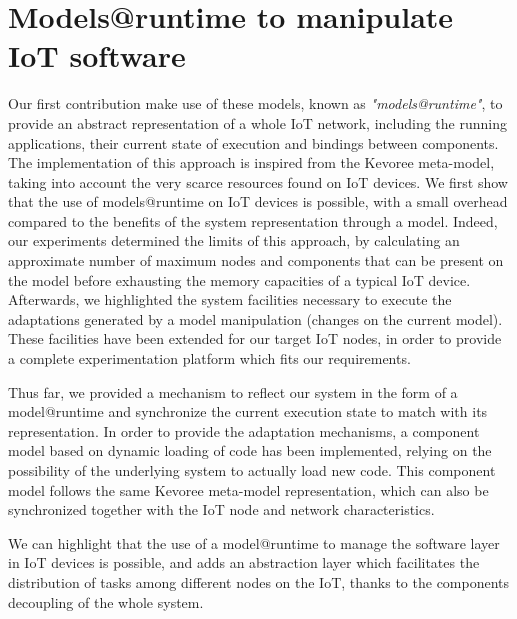 \section{Models@runtime to manipulate IoT software}
Our first contribution make use of these models, known as \textit{"models@runtime"}, to provide an abstract representation of a whole IoT network, including the running applications, their current state of execution and bindings between components.
The implementation of this approach is inspired from the Kevoree meta-model, taking into account the very scarce resources found on IoT devices.
We first show that the use of models@runtime on IoT devices is possible, with a small overhead compared to the benefits of the system representation through a model.
Indeed, our experiments determined the limits of this approach, by calculating an approximate number of maximum nodes and components that can be present on the model before exhausting the memory capacities of a typical IoT device.
Afterwards, we highlighted the system facilities necessary to execute the adaptations generated by a model manipulation (changes on the current model).
These facilities have been extended for our target IoT nodes, in order to provide a complete experimentation platform which fits our requirements.

Thus far, we provided a mechanism to reflect our system in the form of a model@runtime and synchronize the current execution state to match with its representation.
In order to provide the adaptation mechanisms, a component model based on dynamic loading of code has been implemented, relying on the possibility of the underlying system to actually load new code.
This component model follows the same Kevoree meta-model representation, which can also be synchronized together with the IoT node and network characteristics.

We can highlight that the use of a model@runtime to manage the software layer in IoT devices is possible, and adds an abstraction layer which facilitates the distribution of tasks among different nodes on the IoT, thanks to the components decoupling of the whole system.

